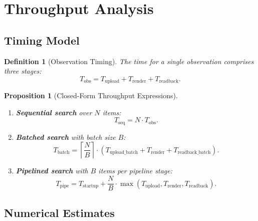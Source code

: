 \documentclass[11pt,twocolumn,a4paper]{article}
\newtheorem{proposition}[theorem]{Proposition}
\newtheorem{definition}[theorem]{Definition}
\begin{document}
\section{Throughput Analysis}
\label{sec:throughput}

\subsection{Timing Model}

\begin{definition}[Observation Timing]
\label{def:timing}
The time for a single observation comprises three stages:
\begin{equation}
T_{\mathrm{obs}} = T_{\mathrm{upload}} + T_{\mathrm{render}}
  + T_{\mathrm{readback}}.
\label{eq:Tobs}
\end{equation}
\end{definition}

\begin{proposition}[Closed-Form Throughput Expressions]
\label{prop:throughput}
\leavevmode
\begin{enumerate}[label=(\roman*),leftmargin=*]
\item \textbf{Sequential search} over $N$ items:
\begin{equation}
T_{\mathrm{seq}} = N \cdot T_{\mathrm{obs}}.
\label{eq:Tseq}
\end{equation}

\item \textbf{Batched search} with batch size $B$:
\begin{equation}
T_{\mathrm{batch}} = \left\lceil \frac{N}{B} \right\rceil
  \cdot (T_{\mathrm{upload\_batch}} + T_{\mathrm{render}}
  + T_{\mathrm{readback\_batch}}).
\label{eq:Tbatch}
\end{equation}

\item \textbf{Pipelined search} with $B$ items per pipeline stage:
\begin{equation}
T_{\mathrm{pipe}} = T_{\mathrm{startup}}
  + \frac{N}{B} \cdot
  \max(T_{\mathrm{upload}}, T_{\mathrm{render}},
  T_{\mathrm{readback}}).
\label{eq:Tpipe}
\end{equation}
\end{enumerate}
\end{proposition}

\subsection{Numerical Estimates}
\end{document}
